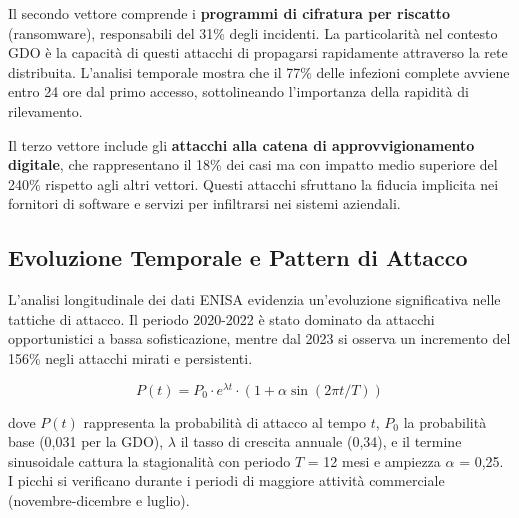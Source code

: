Il secondo vettore comprende i \textbf{programmi di cifratura per riscatto} (ransomware), responsabili del 31\% degli incidenti. La particolarità nel contesto GDO è la capacità di questi attacchi di propagarsi rapidamente attraverso la rete distribuita. L'analisi temporale mostra che il 77\% delle infezioni complete avviene entro 24 ore dal primo accesso, sottolineando l'importanza della rapidità di rilevamento.

Il terzo vettore include gli \textbf{attacchi alla catena di approvvigionamento digitale}, che rappresentano il 18\% dei casi ma con impatto medio superiore del 240\% rispetto agli altri vettori. Questi attacchi sfruttano la fiducia implicita nei fornitori di software e servizi per infiltrarsi nei sistemi aziendali.

\subsection{Evoluzione Temporale e Pattern di Attacco}
\label{subsec:evoluzione_temporale}

L'analisi longitudinale dei dati ENISA\autocite{enisa2024threat} evidenzia un'evoluzione significativa nelle tattiche di attacco. Il periodo 2020-2022 è stato dominato da attacchi opportunistici a bassa sofisticazione, mentre dal 2023 si osserva un incremento del 156\% negli attacchi mirati e persistenti.

\begin{equation}
\label{eq:probabilita_attacco}
P(t) = P_0 \cdot e^{\lambda t} \cdot (1 + \alpha \sin(2\pi t/T))
\end{equation}

dove $P(t)$ rappresenta la probabilità di attacco al tempo $t$, $P_0$ la probabilità base (0,031 per la GDO), $\lambda$ il tasso di crescita annuale (0,34), e il termine sinusoidale cattura la stagionalità con periodo $T$ = 12 mesi e ampiezza $\alpha$ = 0,25. I picchi si verificano durante i periodi di maggiore attività commerciale (novembre-dicembre e luglio).

